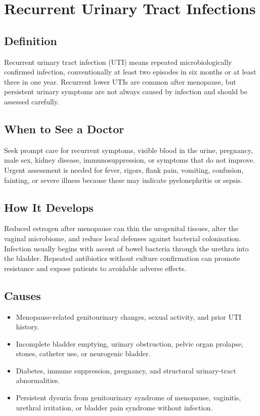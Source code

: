 \chapter{Recurrent Urinary Tract Infections}

\section*{Definition}
Recurrent urinary tract infection (UTI) means repeated microbiologically confirmed infection, conventionally at least two episodes in six months or at least three in one year. Recurrent lower UTIs are common after menopause, but persistent urinary symptoms are not always caused by infection and should be assessed carefully.

\section*{When to See a Doctor}
Seek prompt care for recurrent symptoms, visible blood in the urine, pregnancy, male sex, kidney disease, immunosuppression, or symptoms that do not improve. Urgent assessment is needed for fever, rigors, flank pain, vomiting, confusion, fainting, or severe illness because these may indicate pyelonephritis or sepsis.

\section*{How It Develops}
Reduced estrogen after menopause can thin the urogenital tissues, alter the vaginal microbiome, and reduce local defenses against bacterial colonisation. Infection usually begins with ascent of bowel bacteria through the urethra into the bladder. Repeated antibiotics without culture confirmation can promote resistance and expose patients to avoidable adverse effects.

\section*{Causes}
\begin{itemize}
  \item Menopause-related genitourinary changes, sexual activity, and prior UTI history.
  \item Incomplete bladder emptying, urinary obstruction, pelvic organ prolapse, stones, catheter use, or neurogenic bladder.
  \item Diabetes, immune suppression, pregnancy, and structural urinary-tract abnormalities.
  \item Persistent dysuria from genitourinary syndrome of menopause, vaginitis, urethral irritation, or bladder pain syndrome without infection.
\end{itemize}

